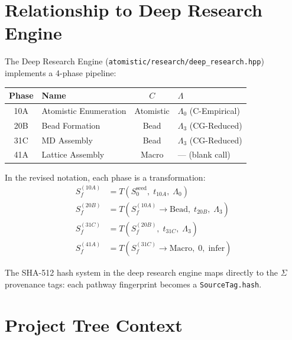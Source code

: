 \documentclass[11pt]{article}
\begin{document}
\section{Relationship to Deep Research Engine}

The Deep Research Engine (\texttt{atomistic/research/deep\_research.hpp}) implements a 4-phase pipeline:

\begin{center}
\begin{tabular}{clcl}
\toprule
\textbf{Phase} & \textbf{Name} & \textbf{$C$} & \textbf{$\Lambda$} \\
\midrule
10A & Atomistic Enumeration & Atomistic & $\Lambda_0$ (C-Empirical) \\
20B & Bead Formation & Bead & $\Lambda_3$ (CG-Reduced) \\
31C & MD Assembly & Bead & $\Lambda_3$ (CG-Reduced) \\
41A & Lattice Assembly & Macro & --- (blank call) \\
\bottomrule
\end{tabular}
\end{center}

In the revised notation, each phase is a transformation:
\begin{align}
S_f^{(10A)} &= T(S_0^{\text{seed}}, \; t_{10A}, \; \Lambda_0) \\
S_f^{(20B)} &= T(S_f^{(10A)} \to \text{Bead}, \; t_{20B}, \; \Lambda_3) \\
S_f^{(31C)} &= T(S_f^{(20B)}, \; t_{31C}, \; \Lambda_3) \\
S_f^{(41A)} &= T(S_f^{(31C)} \to \text{Macro}, \; 0, \; \text{infer})
\end{align}

The SHA-512 hash system in the deep research engine maps directly to the $\Sigma$ provenance tags: each pathway fingerprint becomes a \texttt{SourceTag.hash}.

\section{Project Tree Context}
\end{document}
